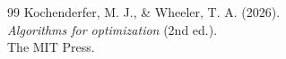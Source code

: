 \begin{thebibliography}{99}
    Kochenderfer, M. J., \& Wheeler, T. A. (2026). \\
    \textit{Algorithms for optimization} (2nd ed.). \\
    The MIT Press.
\end{thebibliography}